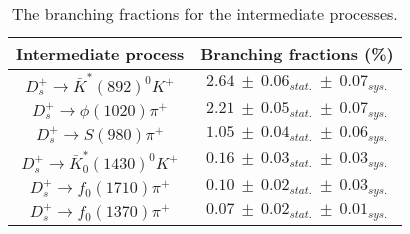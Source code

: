 {    \begin{table}[htbp]
        \caption{The branching fractions for the intermediate processes.}
        \label{inter-processes}
        \begin{center}
            \begin{tabular}{cc}
                \toprule\toprule
                Intermediate process & Branching fractions (\%)\\
                \hline
                $D_{s}^{+} \rightarrow \bar{K}^{*}(892)^{0}K^{+}$               & $2.64\ \pm\ 0.06_{stat.}\ \pm\ 0.07_{sys.}$  \\
                $D_{s}^{+} \rightarrow \phi(1020)\pi^{+}$                       & $2.21\ \pm\ 0.05_{stat.}\ \pm\ 0.07_{sys.}$  \\
                $D_{s}^{+} \rightarrow S(980)\pi^{+}$                           & $1.05\ \pm\ 0.04_{stat.}\ \pm\ 0.06_{sys.}$  \\
                $D_{s}^{+} \rightarrow \bar{K}^{*}_{0}(1430)^{0}K^{+}$          & $0.16\ \pm\ 0.03_{stat.}\ \pm\ 0.03_{sys.}$  \\
                $D_{s}^{+} \rightarrow f_{0}(1710)\pi^{+}$                      & $0.10\ \pm\ 0.02_{stat.}\ \pm\ 0.03_{sys.}$  \\
                $D_{s}^{+} \rightarrow f_{0}(1370)\pi^{+}$                      & $0.07\ \pm\ 0.02_{stat.}\ \pm\ 0.01_{sys.}$  \\
                \bottomrule\bottomrule
            \end{tabular}
        \end{center}
    \end{table}



}

